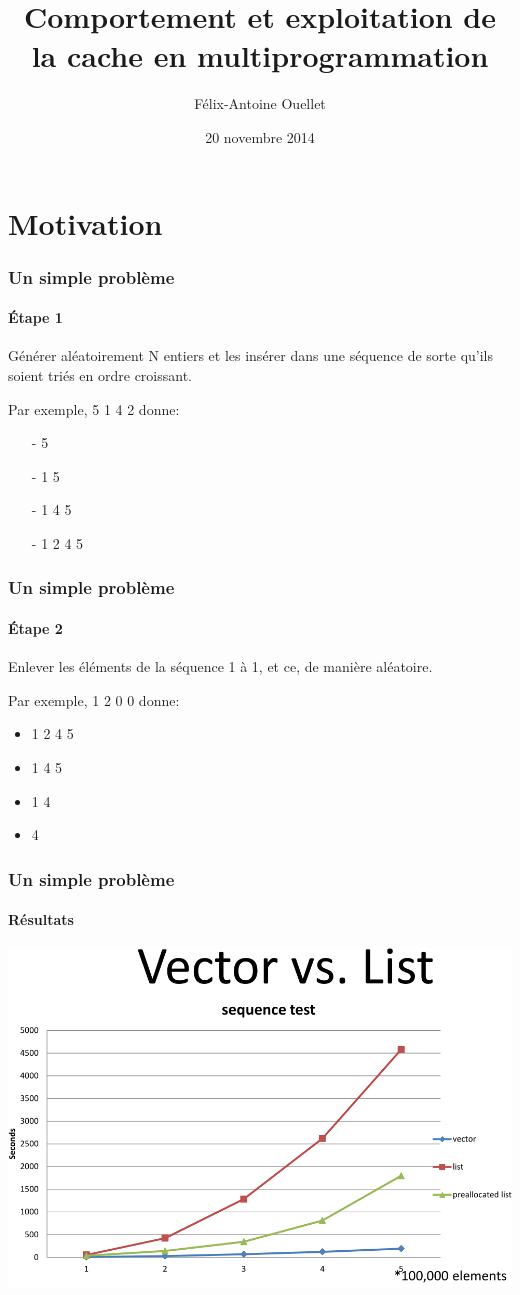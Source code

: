 \documentclass{beamer}
\author[Félix-Antoine Ouellet]{Félix-Antoine Ouellet}
\title[Cache\hspace{2em}\insertframenumber/\inserttotalframenumber]{Comportement et exploitation de la cache en multiprogrammation}
\institute{Université de Sherbrooke}
\date{20 novembre 2014}
\begin{document}
\begin{frame}
\titlepage %
\end{frame}

\begin{frame}
\tableofcontents[hideallsubsections]
\end{frame}

\section{Motivation}
\begin{frame}
\frametitle{Un simple problème}
\framesubtitle{Étape 1}
Générer aléatoirement N entiers et les insérer dans une séquence de sorte qu'ils soient triés en ordre croissant.

Par exemple, 5 1 4 2 donne:
\begin{itemize}
\item[-] 5
\item[-] 1 5
\item[-] 1 4 5
\item[-] 1 2 4 5
\end{itemize}
\end{frame}

\begin{frame}
\frametitle{Un simple problème}
\framesubtitle{Étape 2}
Enlever les éléments de la séquence 1 à 1, et ce, de manière aléatoire.

Par exemple, 1 2 0 0 donne:
\begin{itemize}
\item 1 2 4 5
\item 1 4 5
\item 1 4
\item 4
\end{itemize}
\end{frame}

\begin{frame}
\frametitle{Un simple problème}
\framesubtitle{Résultats}
\begin{center}
\colorbox{white}{\includegraphics[scale=0.25]{VS.png}}
\end{center}
\end{frame}
\end{document}

